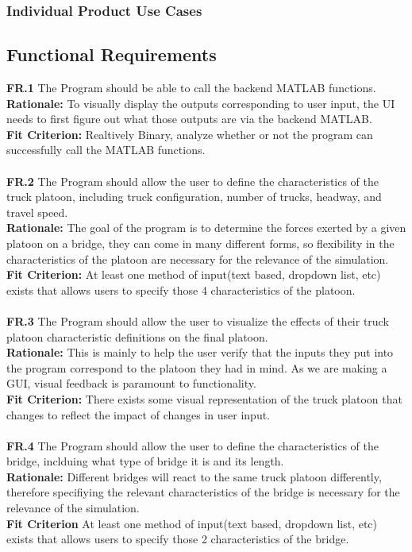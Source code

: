 \documentclass[12pt]{article}
\begin{document}
\subsubsection{Individual Product Use Cases}

\subsection{Functional Requirements}
  \textbf{FR.1} The Program should be able to call the backend MATLAB functions. \\
  \textbf{Rationale:} To visually display the outputs corresponding to user input, the UI needs to first figure out what those outputs are via the backend MATLAB.\\
  \textbf{Fit Criterion:} Realtively Binary, analyze whether or not the program can successfully call the MATLAB functions.\\\\
  
  \textbf{FR.2} The Program should allow the user to define the characteristics of the truck platoon, including truck configuration, number of trucks, headway, and travel speed.\\
  \textbf{Rationale:} The goal of the program is to determine the forces exerted by a given platoon on a bridge, they can come in many different forms, so flexibility in the characteristics
  of the platoon are necessary for the relevance of the simulation.\\ 
  \textbf{Fit Criterion:} At least one method of input(text based, dropdown list, etc) exists that allows users to specify those 4 characteristics of the platoon.\\\\

  \textbf{FR.3} The Program should allow the user to visualize the effects of their truck platoon characteristic definitions on the final platoon.\\
  \textbf{Rationale:} This is mainly to help the user verify that the inputs they put into the program correspond to the platoon they had in mind. As we are making a GUI,
  visual feedback is paramount to functionality.\\
  \textbf{Fit Criterion:} There exists some visual representation of the truck platoon that changes to reflect the impact of changes in user input.\\\\

  \textbf{FR.4} The Program should allow the user to define the characteristics of the bridge, inclduing what type of bridge it is and its length.\\
  \textbf{Rationale:} Different bridges will react to the same truck platoon differently, therefore specifiying the relevant characteristics of the bridge is necessary for
  the relevance of the simulation.\\
  \textbf{Fit Criterion} At least one method of input(text based, dropdown list, etc) exists that allows users to specify those 2 characteristics of the bridge.\\\\
  
\end{document}
